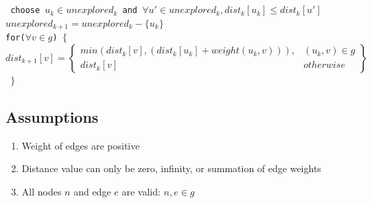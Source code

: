 \documentclass[11pt, oneside]{article}   	%
\newcommand\tab[1][1cm]{\hspace*{#1}}
\theoremstyle{definition}
\begin{document}
\\\\
\texttt{
  \tab\tab choose $u_k \in unexplored_k$ and $\forall u' \in unexplored_k, dist_k[u_k] \leq dist_k[u']$ \\
  \tab\tab $unexplored_{k+1} = unexplored_k - \{u_k\}$                    \\
  \tab\tab for($\forall v \in g$) $\{$
  \tab\[
        dist_{k+1}[v] = \left.
       \begin{cases} 
          min(dist_k[v], (dist_k[u_k] + weight(u_k,v))), & (u_k,v) \in g \\ 
          dist_k[v] & otherwise 
        \end{cases}
        \right\}
      \]
  \tab\tab $\}$ \\
}

\subsection{Assumptions}
\begin{enumerate}
  \item Weight of edges are positive
  \item Distance value can only be zero, infinity, or summation of edge weights
  \item All nodes $n$ and edge $e$ are valid: $n, e \in g$
\end{enumerate}
\end{document}
